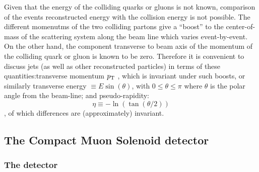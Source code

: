 Given that the energy of the colliding quarks or gluons is not known, comparison of the events reconstructed
energy with the collision energy is not possible. The different momenutms of the two colliding partons give a
``boost'' to the center-of-mass of the scattering system along the beam line which varies event-by-event. 
On the other hand, the component transverse to beam axis of the momentum of the colliding quark or gluon is known 
to be zero. Therefore it is convenient to discuss jets (as well as other reconstructed 
particles) in terms of these quantities:transverse momentum $p_{\mathrm{T}}$ , which is invariant under such boosts, or similarly transverse
energy $\equiv E \sin\left(\theta\right)$, with $0 \leq \theta \leq \pi$ where $\theta$
is the polar angle from the beam-line; and pseudo-rapidity:
\begin{equation}
        \eta \equiv −\ln\left( \tan\left(\theta/2\right)\right)
        \label{pseudo}      
\end{equation}
, of which differences are (approximately) invariant.

\subsection{The Compact Muon Solenoid detector\label{sec:cms}}

\subsubsection{The detector}


